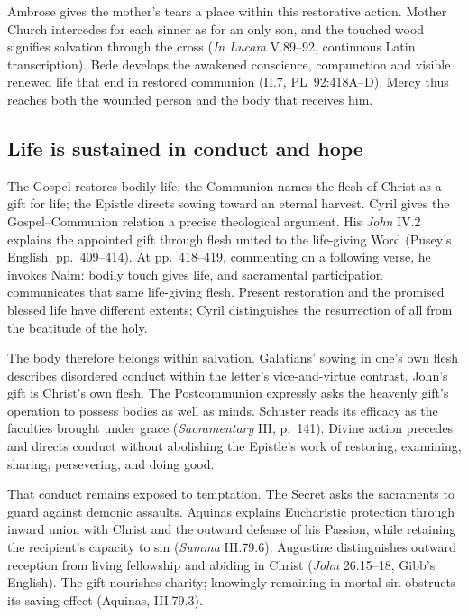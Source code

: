 Ambrose gives the mother's tears a place within this restorative action.
Mother Church intercedes for each sinner as for an only son, and the
touched wood signifies salvation through the cross (\emph{In Lucam}
V.89--92, continuous Latin transcription). Bede develops the awakened conscience,
compunction and visible renewed life that end in restored communion
(II.7, PL~92:418A--D). Mercy thus reaches both the wounded person and the
body that receives him.

\clearpage
\label{triptych:brief-synthesis:end}

\subsection*{Life is sustained in conduct and hope\enspace{}}

The Gospel restores bodily life; the Communion names the flesh of Christ
as a gift for life; the Epistle directs sowing toward an eternal harvest.
Cyril gives the Gospel--Communion relation a precise theological argument.
His \emph{John} IV.2 explains the appointed gift through flesh united to
the life-giving Word (Pusey's English, pp.~409--414). At pp.~418--419,
commenting on a following verse, he invokes Naim: bodily touch gives life,
and sacramental participation communicates that same life-giving flesh.
Present restoration and the promised blessed life have different extents;
Cyril distinguishes the resurrection of all from the beatitude of the holy.

The body therefore belongs within salvation. Galatians' sowing in one's own
flesh describes disordered conduct within the letter's vice-and-virtue
contrast. John's gift is Christ's own flesh. The Postcommunion expressly
asks the heavenly gift's operation to possess bodies as well as minds.
Schuster reads its efficacy as the faculties brought under grace
(\emph{Sacramentary} III, p.~141). Divine action precedes and directs
conduct without abolishing the Epistle's work of restoring, examining,
sharing, persevering, and doing good.

That conduct remains exposed to temptation. The Secret asks the sacraments
to guard against demonic assaults. Aquinas explains Eucharistic protection
through inward union with Christ and the outward defense of his Passion,
while retaining the recipient's capacity to sin (\emph{Summa} III.79.6).
Augustine distinguishes outward reception from living fellowship and abiding
in Christ (\emph{John} 26.15--18, Gibb's English). The gift nourishes charity;
knowingly remaining in mortal sin obstructs its saving effect
(Aquinas, III.79.3).

